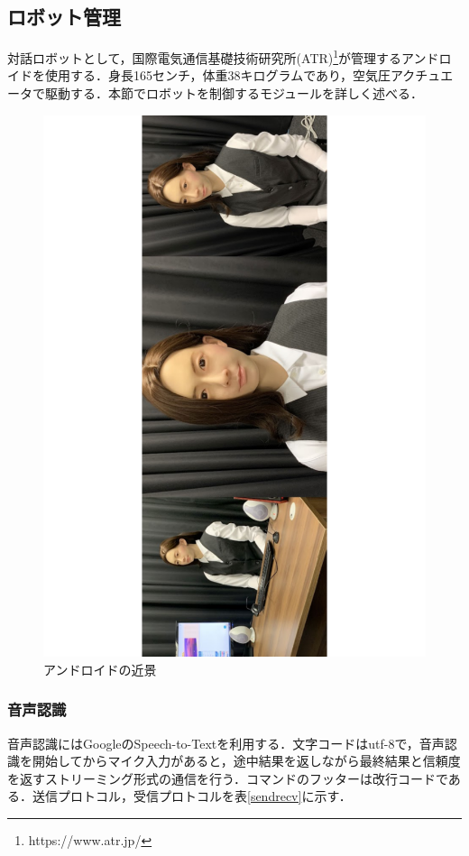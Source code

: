 \subsection{ロボット管理}
\label{対話システムを構成するモジュール}
対話ロボットとして，国際電気通信基礎技術研究所(ATR)\footnote{https://www.atr.jp/}が管理するアンドロイドを使用する．身長165センチ，体重38キログラムであり，空気圧アクチュエータで駆動する．本節でロボットを制御するモジュールを詳しく述べる．
\begin{figure}[th]
    \centering
    \includegraphics[scale=0.4,angle=270]{pic/ai.pdf}
    \caption{アンドロイドの近景}
    \label{kinkei}
\end{figure}

\subsubsection{音声認識}
音声認識にはGoogleのSpeech-to-Textを利用する．文字コードはutf-8で，音声認識を開始してからマイク入力があると，途中結果を返しながら最終結果と信頼度を返すストリーミング形式の通信を行う．コマンドのフッターは改行コードである．送信プロトコル，受信プロトコルを表\ref{sendrecv}に示す．

